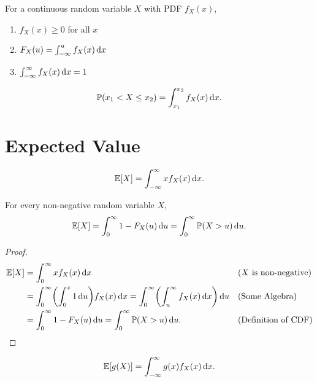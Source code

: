 \begin{theorem}
    For a continuous random variable $X$ with \textnormal{PDF} $f_X(x)$,
    \begin{enumerate}
        \item $f_X(x)\geq 0$ for all $x$
        \item $F_X(u)=\int_{-\infty}^u f_X(x)\mathop{}\!\mathrm{d} x$
        \item $\int_{-\infty}^{\infty} f_X(x)\mathop{}\!\mathrm{d} x = 1$
    \end{enumerate}
\end{theorem}

\begin{theorem}
    \begin{align*}
        \P{x_1<X\leq x_2}=\int_{x_1}^{x_2}f_X(x)\diff x.
    \end{align*}
\end{theorem}


\section{Expected Value}
\begin{definition}
    \begin{align*}
        \E{X}=\int_{-\infty}^{\infty} xf_X(x) \diff x.
    \end{align*}
\end{definition}

\begin{theorem}
    For every non-negative random variable $X$, \[\E{X}=\int_{0}^{\infty}1-F_X(u)\diff u=\int_{0}^{\infty}\P{X>u}\diff u.\]
\end{theorem}

\begin{proof}
    \begin{align*}
        \E{X}
        &= \int_{0}^{\infty}xf_X(x)\diff x && \text{($X$ is non-negative)} \\
        &= \int_{0}^{\infty}\parens*{\int_{0}^{x} 1 \diff u} f_X(x)\diff x = \int_{0}^{\infty}\parens*{\int_{u}^{\infty}f_X(x)\diff x}\diff u && \text{(Some Algebra)}\\
        &= \int_{0}^{\infty}1-F_X(u)\diff u = \int_{0}^{\infty}\P{X>u}\diff u. && \text{(Definition of CDF)}
    \end{align*}
\end{proof}

\begin{theorem}
    \begin{align*}
        \E{g(X)} = \int_{-\infty}^{\infty} g(x)f_X(x)\diff x.
    \end{align*}
\end{theorem}

